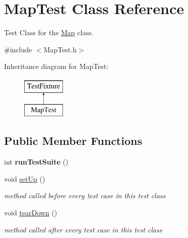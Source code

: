 \hypertarget{classMapTest}{}\section{Map\+Test Class Reference}
\label{classMapTest}


Test Class for the \hyperlink{classMap}{Map} class.  




{\ttfamily \#include $<$Map\+Test.\+h$>$}

Inheritance diagram for Map\+Test\+:\begin{figure}[H]
\begin{center}
\leavevmode
\includegraphics[height=2.000000cm]{classMapTest}
\end{center}
\end{figure}
\subsection*{Public Member Functions}
\begin{DoxyCompactItemize}
\item 
\hypertarget{classMapTest_a95f5627ffc7827b992ad5af233e3012d}{}\label{classMapTest_a95f5627ffc7827b992ad5af233e3012d} 
int {\bfseries run\+Test\+Suite} ()
\item 
\hypertarget{classMapTest_a548501698e49e4de388482c502962cfd}{}\label{classMapTest_a548501698e49e4de388482c502962cfd} 
void \hyperlink{classMapTest_a548501698e49e4de388482c502962cfd}{set\+Up} ()
\begin{DoxyCompactList}\small\item\em method called before every test case in this test class \end{DoxyCompactList}\item 
\hypertarget{classMapTest_a1a75bd7462d39afc6f5039fa36252cca}{}\label{classMapTest_a1a75bd7462d39afc6f5039fa36252cca} 
void \hyperlink{classMapTest_a1a75bd7462d39afc6f5039fa36252cca}{tear\+Down} ()
\begin{DoxyCompactList}\small\item\em method called after every test case in this test class \end{DoxyCompactList}\end{DoxyCompactItemize}
